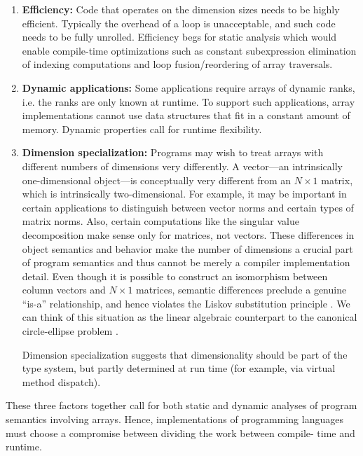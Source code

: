 \documentclass[preprint]{sigplanconf}
\begin{document}
\begin{enumerate}

\item{\bf Efficiency:} Code that operates on the dimension sizes needs to be
highly efficient. Typically the overhead of a loop is unacceptable, and such
code needs to be fully unrolled. Efficiency begs for static analysis which
would enable compile-time optimizations such as constant subexpression
elimination of indexing computations and loop fusion/reordering of array
traversals.

\item{\bf Dynamic applications:} Some applications require arrays of dynamic
ranks, i.e. the ranks are only known at runtime. To support such applications,
array implementations cannot use data structures that fit in a constant amount
of memory. Dynamic properties call for runtime flexibility.

\item {\bf Dimension specialization:} Programs may wish to treat arrays with
different numbers of dimensions very differently. A vector---an intrinsically
one-dimensional object---is conceptually very different from an $N\times1$
matrix, which is intrinsically two-dimensional. For example, it may be
important in certain applications to distinguish between vector norms and
certain types of matrix norms. Also, certain computations like the singular
value decomposition make sense only for matrices, not vectors. These
differences in object semantics and behavior make the number of dimensions a
crucial part of program semantics and thus cannot be merely a compiler
implementation detail. Even though it is possible to construct an isomorphism
between column vectors and $N\times1$ matrices, semantic differences preclude
a genuine ``is-a'' relationship, and hence violates the Liskov substitution
principle \cite{Liskov:1987da}. We can think of this situation as the linear
algebraic counterpart to the canonical circle-ellipse problem
\cite{Halbert:1987ut}.

Dimension specialization suggests that dimensionality should be part of the
type system, but partly determined at run time (for example, via virtual
method dispatch).

\end{enumerate}

These three factors together call for both static and dynamic analyses of
program semantics involving arrays. Hence, implementations of programming
languages must choose a compromise between dividing the work between compile-
time and runtime.
\end{document}
